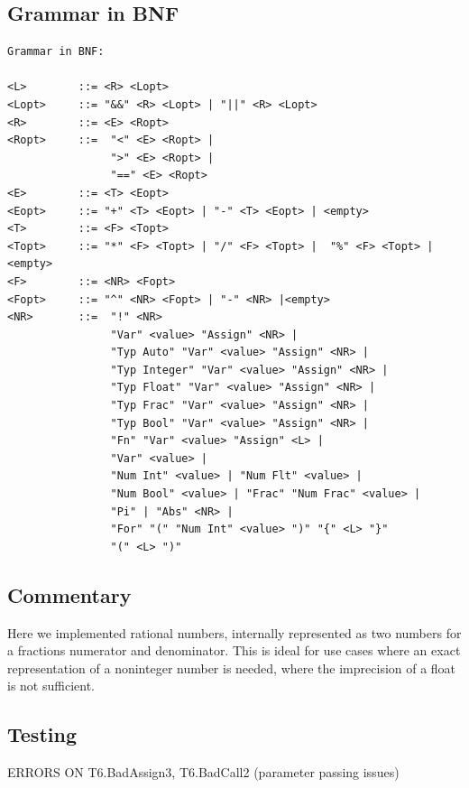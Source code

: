 \documentclass[a4paper, oneside, 11pt]{report}
\begin{document}
    \subsection{Grammar in BNF}
    \begin{verbatim}
Grammar in BNF:

<L>        ::= <R> <Lopt>
<Lopt>     ::= "&&" <R> <Lopt> | "||" <R> <Lopt>
<R>        ::= <E> <Ropt>
<Ropt>     ::=  "<" <E> <Ropt> |
                ">" <E> <Ropt> |
                "==" <E> <Ropt>
<E>        ::= <T> <Eopt>
<Eopt>     ::= "+" <T> <Eopt> | "-" <T> <Eopt> | <empty>
<T>        ::= <F> <Topt>
<Topt>     ::= "*" <F> <Topt> | "/" <F> <Topt> |  "%" <F> <Topt> |<empty>
<F>        ::= <NR> <Fopt>
<Fopt>     ::= "^" <NR> <Fopt> | "-" <NR> |<empty>
<NR>       ::=  "!" <NR>
                "Var" <value> "Assign" <NR> |
                "Typ Auto" "Var" <value> "Assign" <NR> |
                "Typ Integer" "Var" <value> "Assign" <NR> |
                "Typ Float" "Var" <value> "Assign" <NR> |
                "Typ Frac" "Var" <value> "Assign" <NR> |
                "Typ Bool" "Var" <value> "Assign" <NR> |
                "Fn" "Var" <value> "Assign" <L> |
                "Var" <value> |
                "Num Int" <value> | "Num Flt" <value> |
                "Num Bool" <value> | "Frac" "Num Frac" <value> |
                "Pi" | "Abs" <NR> |
                "For" "(" "Num Int" <value> ")" "{" <L> "}"
                "(" <L> ")"

    \end{verbatim}
    \subsection{Commentary}
    Here we implemented rational numbers, internally represented as two numbers for a fractions numerator and denominator. This is ideal for use cases where an exact representation of a noninteger number is needed, where the imprecision of a float is not sufficient.

    \subsection{Testing}
    ERRORS ON T6.BadAssign3, T6.BadCall2 (parameter passing issues)

    \clearpage
\end{document}
